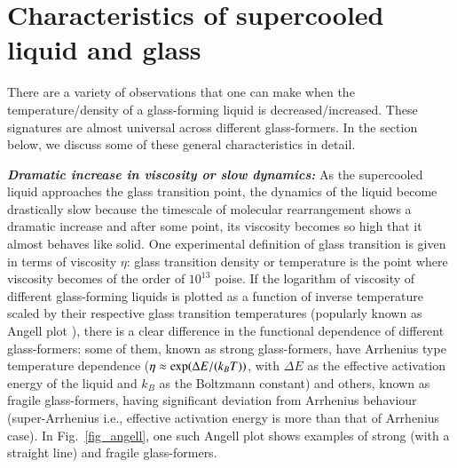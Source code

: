 \section{Characteristics of supercooled liquid and glass}
There are a variety of observations that one can make when the temperature/density of a glass-forming liquid is decreased/increased. These signatures are almost universal across different glass-formers. In the section below, we discuss some of these general characteristics in detail.

{\bf \em Dramatic increase in viscosity or slow dynamics:} As the supercooled liquid approaches the glass transition point, the dynamics of the liquid become drastically slow because the timescale of molecular rearrangement shows a dramatic increase and after some point, its viscosity becomes so high that it almost behaves like solid. One experimental definition of glass transition is given in terms of viscosity $\eta$: glass transition density or temperature is the point where viscosity becomes of the order of $10^{13}$ poise. If the logarithm of viscosity of different glass-forming liquids is plotted as a function of inverse temperature scaled by their respective glass transition temperatures (popularly known as Angell plot \cite{angell1995formation}), there is a clear difference in the functional dependence of different glass-formers: some of them, known as strong glass-formers, have Arrhenius type temperature dependence ($\eta \approx {\rm exp}(\Delta E/(k_BT))$, with $\Delta E$ as the effective activation energy of the liquid and $k_B$ as the Boltzmann constant) and others, known as fragile glass-formers, having significant deviation from Arrhenius behaviour (super-Arrhenius i.e., effective activation energy is more than that of Arrhenius case). In Fig.~\ref{fig_angell}, one such Angell plot shows examples of strong (with a straight line) and fragile glass-formers.
    

